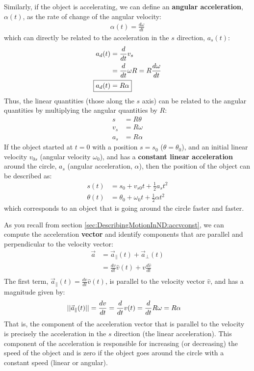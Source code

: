 Similarly, if the object is accelerating, we can define an \textbf{angular acceleration}, $\alpha(t)$, as the rate of change of the angular velocity:
\begin{align*}
\alpha(t)=\frac{d\omega}{dt}
\end{align*}
which can directly be related to the acceleration in the $s$ direction, $a_s(t)$:
\begin{align*}
a_d(t) &= \frac{d}{dt}v_s\\
&=\frac{d}{dt}\omega R=R\frac{d\omega}{dt}\\
\Aboxed{a_d(t)&=R\alpha }
\end{align*}
Thus, the linear quantities (those along the $s$ axis) can be related to the angular quantities by multiplying the angular quantities by $R$:
\begin{align}
s&=R\theta\\
v_s&=R\omega\\
a_s&=R\alpha
\end{align}
If the object started at $t=0$ with a position $s=s_0$ ($\theta=\theta_0$), and an initial linear velocity $v_{0s}$ (angular velocity $\omega_0$), and has a \textbf{constant linear acceleration} around the circle, $a_s$ (angular acceleration, $\alpha$), then the position of the object can be described as:
\begin{align*}
s(t) &= s_0+v_{s0}t+\frac{1}{2}a_s t^2\\
\theta(t) &= \theta_0+\omega_0t+\frac{1}{2}\alpha t^2
\end{align*}
which corresponds to an object that is going around the circle faster and faster.

As you recall from section \ref{sec:DescribingMotionInND:accvconst}, we can compute the acceleration \textbf{vector} and identify components that are parallel and perpendicular to the velocity vector:
\begin{align*}
\vec a&=\vec a_{\parallel}(t) + \vec a_{\bot}(t)\\
&=\frac{dv}{dt}\hat v(t)+v\frac{d\hat v}{dt}\\
\end{align*}
The first term, $\vec a_{\parallel}(t)=\frac{dv}{dt}\hat v(t)$, is parallel to the velocity vector $\hat v$, and has a magnitude given by:
\begin{align*}
||\vec a_{\parallel}(t)||&=\frac{dv}{dt}=\frac{d}{dt} v(t)=\frac{d}{dt} R\omega=R\alpha
\end{align*}
That is, the component of the acceleration vector that is parallel to the velocity is precisely the acceleration in the $s$ direction (the linear acceleration). This component of the acceleration is responsible for increasing (or decreasing) the speed of the object and is zero if the object goes around the circle with a constant speed (linear or angular). 

